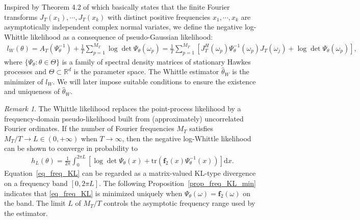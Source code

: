 \documentclass[11pt]{article}
\numberwithin{equation}{section}
\theoremstyle{plain}
\theoremstyle{definition}
\theoremstyle{definition}
\theoremstyle{assumption}
\theoremstyle{proposition}
\theoremstyle{proposition}
\theoremstyle{example}
\theoremstyle{lemma}
\theoremstyle{theorem}
\theoremstyle{remark}
\newtheorem*{remark}{Remark}
\begin{document}
Inspired by Theorem 4.2 of \citet{Brillinger1972} which basically states that the finite Fourier transforms $J_T(x_1),\cdots,J_T(x_k)$ with distinct positive frequencies $x_1,\cdots,x_k$ are asymptotically independent complex normal variates, we define the negative log-Whittle likelihood as a consequence of pseudo-Gaussian likelihood:
\begin{align}\label{Whittle_llike_def_eq}
l_W(\theta) 
= A_T(\Psi_{\theta}^{-1}) + \frac{1}{T}\sum_{p=1}^{M_T} \log\det\Psi_{\theta}(\omega_p)
= \frac{1}{T}\sum_{p=1}^{M_T}\left[J_T^{H}(\omega_p)\Psi_{\theta}^{-1}(\omega_p)J_T(\omega_j) + \log\det\Psi_{\theta}(\omega_p)\right] ,
\end{align}
where $\{\Psi_{\theta}:\theta\in\Theta\}$ is a family of spectral density matrices of stationary Hawkes processes and $\Theta\subset\mathbb{R}^d$ is the parameter space. The Whittle estimator $\hat{\theta}_W$ is the minimizer of $l_W$. We will later impose suitable conditions to ensure the existence and uniqueness of $\hat{\theta}_W$. 
{\begin{remark}
The Whittle likelihood replaces the point-process likelihood by a frequency-domain pseudo-likelihood built from (approximately) uncorrelated Fourier ordinates. If the number of Fourier frequencies $M_T$ satisfies $M_T/T \rightarrow L\in(0,+\infty)$ when $T\rightarrow\infty$, then the negative log-Whittle likelihood can be shown to converge in probability to 
\begin{align}\label{eq_freq_KL}
h_L(\theta) = \frac{1}{2\pi}\int_0^{2\pi L}\left[\log\det\Psi_{\theta}(x) + \mathrm{tr}(\boldsymbol{f}_2(x)\Psi_{\theta}^{-1}(x))  \right]\mathrm{d}x .    
\end{align}
Equation~\eqref{eq_freq_KL} can be regarded as a matrix-valued KL-type divergence on a frequency band $[0,2\pi L]$. The following Proposition~\ref{prop_freq_KL_min} indicates that \eqref{eq_freq_KL} is minimized uniquely when $\Psi_\theta(\omega)=\boldsymbol f_2(\omega)$ on the band. The limit $L$ of $M_T/T$ controls the asymptotic frequency range used by the estimator.
\end{remark}
} 
\end{document}
